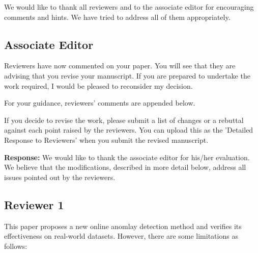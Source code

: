 \documentclass{article}
\makeatletter
\newenvironment{comment}{
\begin{sloppypar}\slshape
\vspace{5 mm}
\color{blue}
 \@beginparpenalty\@M
  \begin{list}{}{\setlength{\topsep}{0ex}%
  \setlength{\leftmargin}{\rightmargin}}\item[]
 \@beginparpenalty\@endparpenalty
}
{\end{list}
\end{sloppypar}
}
\makeatother
\begin{document}
We would like to thank all reviewers and to the associate editor for
encouraging comments and hints. We have tried to address all of them
appropriately.

\subsection*{Associate Editor}

\begin{comment}
Reviewers have now commented on your paper. You will see that they are advising that you revise your manuscript. If you are prepared to undertake the work required, I would be pleased to reconsider my decision.

For your guidance, reviewers' comments are appended below.

If you decide to revise the work, please submit a list of changes or a rebuttal against each point raised by the reviewers. You can upload this as the 'Detailed Response to Reviewers' when you submit the revised manuscript.
\end{comment}
{\bf Response:}
We would like to thank the associate editor for his/her evaluation. We
believe that the modifications, described in more detail below,
address all issues pointed out by the reviewers.

\subsection*{Reviewer 1}
\begin{comment}
This paper proposes a new online anomlay detection method and verifies its effectiveness on real-world datasets. However, there are some limitations as follows:
\end{comment}
\end{document}
